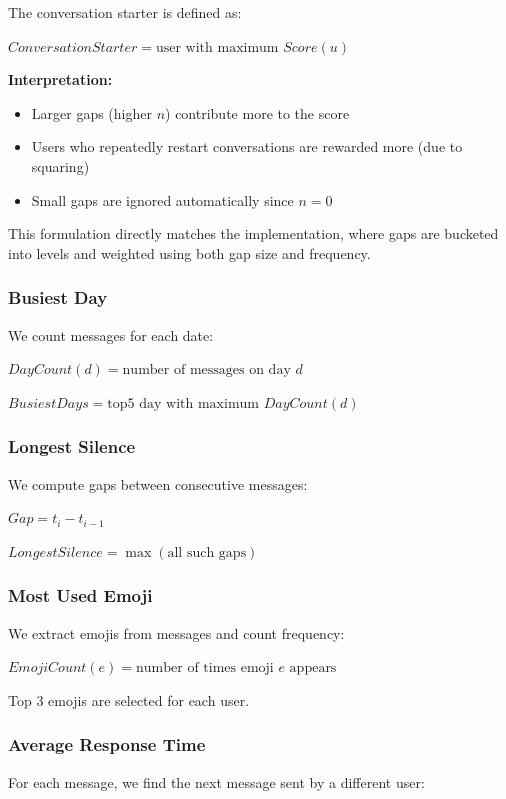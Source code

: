 \documentclass[12pt]{article}
\begin{document}
The conversation starter is defined as:

$ConversationStarter = \text{user with maximum } Score(u)$

\textbf{Interpretation:}
\begin{itemize}
\item Larger gaps (higher $n$) contribute more to the score
\item Users who repeatedly restart conversations are rewarded more (due to squaring)
\item Small gaps are ignored automatically since $n = 0$
\end{itemize}

This formulation directly matches the implementation, where gaps are bucketed into levels and weighted using both gap size and frequency.

\subsubsection{Busiest Day}

We count messages for each date:

$DayCount(d) = \text{number of messages on day } d$

$BusiestDays = \text{top5 day with maximum } DayCount(d)$

\subsubsection{Longest Silence}

We compute gaps between consecutive messages:

$Gap = t_i - t_{i-1}$

$LongestSilence = \max(\text{all such gaps})$

\subsubsection{Most Used Emoji}

We extract emojis from messages and count frequency:

$EmojiCount(e) = \text{number of times emoji } e \text{ appears}$

Top 3 emojis are selected for each user.

\subsubsection{Average Response Time}

For each message, we find the next message sent by a different user:
\end{document}
